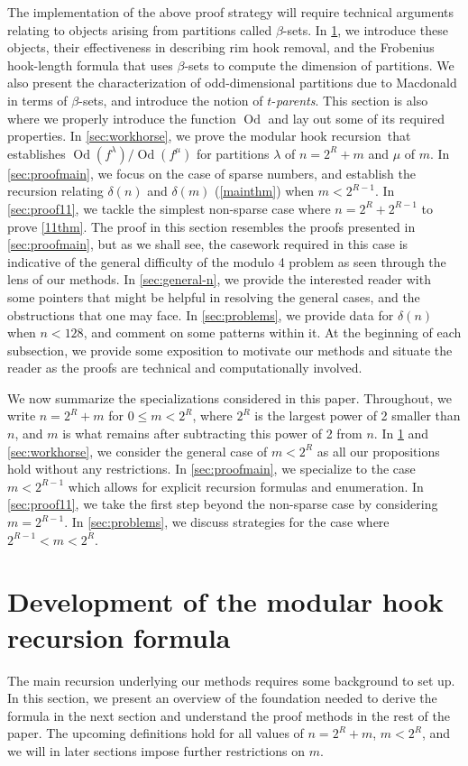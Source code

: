 \documentclass[12pt]{amsart}
\theoremstyle{definition}
\numberwithin{equation}{section}
\newcommand{\la}{\lambda}
\newcommand{\workhorse}{modular hook recursion}
\DeclareMathOperator{\Od}{Od}
\begin{document}
The implementation of the above proof strategy will require technical arguments relating to objects arising from partitions called $\beta$-sets. In \cref{sec:notation}, we introduce these objects, their effectiveness in describing rim hook removal, and the Frobenius hook-length formula that uses $\beta$-sets to compute the dimension of partitions. We also present the characterization of odd-dimensional partitions due to Macdonald \cite{mcd} in terms of $\beta$-sets, and introduce the notion of $t$-\textit{parents}. This section is also where we properly introduce the function $\Od$ and lay out some of its required properties. In \cref{sec:workhorse}, we prove the \workhorse\, that establishes $\Od(f^\la)/\Od(f^\mu)$ for partitions $\la$ of $n = 2^R + m$ and $\mu$ of $m$.  In \cref{sec:proofmain}, we focus on the case of sparse numbers, and establish the recursion relating $\delta(n)$ and $\delta(m)$ (\cref{mainthm}) when $m < 2^{R-1}$. In \cref{sec:proof11}, we tackle the simplest non-sparse case where $n = 2^R + 2^{R-1}$ to prove \cref{11thm}. The proof in this section resembles the proofs presented in \cref{sec:proofmain}, but as we shall see, the casework required in this case is indicative of the general difficulty of the modulo 4 problem as seen through the lens of our methods. In \cref{sec:general-n}, we provide the interested reader with some pointers that might be helpful in resolving the general cases, and the obstructions that one may face. In \cref{sec:problems}, we provide data for $\delta(n)$ when $n < 128$, and comment on some patterns within it. At the beginning of each subsection, we provide some exposition to motivate our methods and situate the reader as the proofs are technical and computationally involved. 

We now summarize the specializations considered in this paper.
Throughout, we write $n = 2^R + m$ for $0 \leq m < 2^R$, where $2^R$ is the largest power of 2 smaller than $n$, and $m$ is what remains after subtracting this power of 2 from $n$.
In \cref{sec:notation} and \cref{sec:workhorse}, we consider the general case of $m < 2^R$ as all our propositions hold without any restrictions. In \cref{sec:proofmain}, we specialize to the case $m < 2^{R-1}$ which allows for explicit recursion formulas and enumeration. In \cref{sec:proof11}, we take the first step beyond the non-sparse case by considering $m = 2^{R-1}$. In \cref{sec:problems}, we discuss strategies for the case where $2^{R-1} < m < 2^{R}$.
 
\section{Development of the modular hook recursion formula}\label{sec:notation}
The main recursion underlying our methods requires some background to set up. In this section, we present an overview of the foundation needed to derive the formula in the next section and understand the proof methods in the rest of the paper. The upcoming definitions hold for all values of $n = 2^R + m$, $m < 2^R$, and we will in later sections impose further restrictions on $m$.
\end{document}
